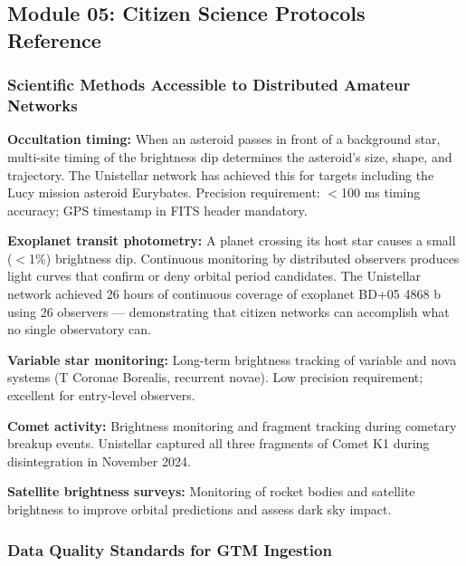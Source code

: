 \documentclass[11pt,letterpaper]{article}
\begin{document}
\subsection{Module 05: Citizen Science Protocols Reference}

\subsubsection{Scientific Methods Accessible to Distributed Amateur Networks}

\textbf{Occultation timing:} When an asteroid passes in front of a background star, multi-site timing of the brightness dip determines the asteroid's size, shape, and trajectory. The Unistellar network has achieved this for targets including the Lucy mission asteroid Eurybates. Precision requirement: $<$100 ms timing accuracy; GPS timestamp in FITS header mandatory.

\textbf{Exoplanet transit photometry:} A planet crossing its host star causes a small ($<$1\%) brightness dip. Continuous monitoring by distributed observers produces light curves that confirm or deny orbital period candidates. The Unistellar network achieved 26 hours of continuous coverage of exoplanet BD+05 4868 b using 26 observers --- demonstrating that citizen networks can accomplish what no single observatory can.

\textbf{Variable star monitoring:} Long-term brightness tracking of variable and nova systems (T Coronae Borealis, recurrent novae). Low precision requirement; excellent for entry-level observers.

\textbf{Comet activity:} Brightness monitoring and fragment tracking during cometary breakup events. Unistellar captured all three fragments of Comet K1 during disintegration in November 2024.

\textbf{Satellite brightness surveys:} Monitoring of rocket bodies and satellite brightness to improve orbital predictions and assess dark sky impact.

\subsubsection{Data Quality Standards for GTM Ingestion}
\end{document}
